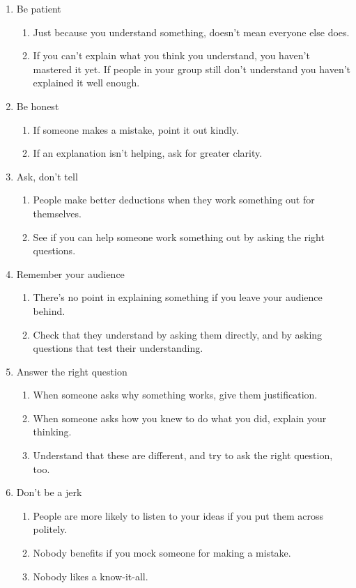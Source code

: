 \documentclass[class=exam, crop=false, 12pt]{standalone}
\begin{document}
\begin{enumerate}
\item Be patient
\begin{enumerate}
\item Just because you understand something, doesn't mean everyone else does.
\item If you can't explain what you think you understand, you haven't mastered it yet. If people in your group still don't understand you haven't explained it well enough.
\end{enumerate}
\item Be honest
\begin{enumerate}
\item If someone makes a mistake, point it out kindly.
\item If an explanation isn't helping, ask for greater clarity.
\end{enumerate}
\item Ask, don't tell
\begin{enumerate}
\item People make better deductions when they work something out for themselves.
\item See if you can help someone work something out by asking the right questions.
\end{enumerate}
\item Remember your audience
\begin{enumerate}
\item There's no point in explaining something if you leave your audience behind.
\item Check that they understand by asking them directly, and by asking questions that test their understanding.
\end{enumerate}
\item Answer the right question
\begin{enumerate}
\item When someone asks why something works, give them justification.
\item When someone asks how you knew to do what you did, explain your thinking.
\item Understand that these are different, and try to ask the right question, too.
\end{enumerate}
\item Don't be a jerk
\begin{enumerate}
\item People are more likely to listen to your ideas if you put them across politely.
\item Nobody benefits if you mock someone for making a mistake.
\item Nobody likes a know-it-all.
\end{enumerate}
\end{enumerate}
\end{document}
